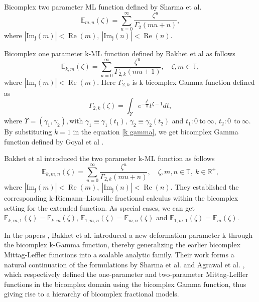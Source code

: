 \documentclass[a4paper,12pt]{article}
\theoremstyle{remark}
\begin{document}
Bicomplex two parameter ML function defined by Sharma et al. \cite{ragarwal2021sept}
\begin{equation}\label{eq :ml2}
\mathbb{E}_{m,n}(\zeta)=\sum_{u=0}^{\infty}\frac{\zeta^u}{\Gamma_2(m u+n )},  \end{equation}
where $|\operatorname{Im_j}(m)|<\operatorname{Re}(m),~|\operatorname{Im_j}(n)|<\operatorname{Re}(n).$


Bicomplex one parameter k-ML function defined by Bakhet et al \cite{bakhet2025new} as follows
\begin{equation}
\mathbb{E}_{k,m}(\zeta) = \sum_{u=0}^{\infty} 
\frac{\zeta^{u}}{\Gamma_{2,k}(mu + 1)},\quad \zeta,m\in \mathbb{T},
\label{eq:kml}
\end{equation}
where $|\operatorname{Im_j}(m)|<\operatorname{Re}(m).$
Here $\Gamma_{2,k}$ is k-bicomplex Gamma function \cite{zayed2025k} defined as
\begin{equation}\label{k gamma}
\Gamma_{2,k}(\zeta) = \int_{\Upsilon} 
e^{-\frac{t^{k}}{k}}  t^{\zeta - 1}  dt,
\end{equation}
where $\Upsilon = (\gamma_{1}, \gamma_{2}), 
\text{with } \gamma_{1} \equiv \gamma_{1}(t_{1}), \, 
\gamma_{2} \equiv \gamma_{2}(t_{2})$ and $ t_{1}: 0 ~\text{to}~ \infty,~t_{2}: 0 ~~\text{to}~ \infty.$ \\
By substituting $k=1$ in the  equation \eqref{k gamma}, we get bicomplex Gamma function  defined by Goyal et al \cite{goyal2006}. %

 Bakhet et al \cite{bakhet2025bicomplex} introduced the two parameter k-ML  function as follows
\begin{equation}
\mathbb{E}_{k,m,n}(\zeta) = \sum_{u=0}^{\infty} 
\frac{\zeta^{u}}{\Gamma_{2,k}(mu + n)},\quad \zeta,m,n\in \mathbb{T},~k\in \mathbb{R}^+,
\label{eq:3.1}
\end{equation}
where $|\operatorname{Im_j}(m)|<\operatorname{Re}(m),~|\operatorname{Im_j}(n)|<\operatorname{Re}(n).$
They  established the corresponding k-Riemann–Liouville fractional calculus within the bicomplex setting for the extended function. As special cases, we can get $\mathbb{E}_{k,m,1}(\zeta)=\mathbb{E}_{k,m}(\zeta)$, $\mathbb{E}_{1,m,n}(\zeta)=\mathbb{E}_{m,n}(\zeta)$ and $\mathbb{E}_{1,m,1}(\zeta)=\mathbb{E}_{m}(\zeta)$.


In the papers \cite{bakhet2025new,bakhet2025bicomplex}, Bakhet et al.  introduced a new deformation parameter k through the bicomplex 
k-Gamma function, thereby generalizing the earlier bicomplex Mittag-Leffler functions into a scalable analytic family. Their work forms a natural continuation of the formulations by Sharma et al. \cite{ragarwal2021sept} and Agrawal et al. \cite{ragarwal2022}, which respectively defined the one-parameter and two-parameter Mittag-Leffler functions in the bicomplex domain using the bicomplex Gamma function, thus giving rise to a hierarchy of bicomplex fractional models.
\end{document}
